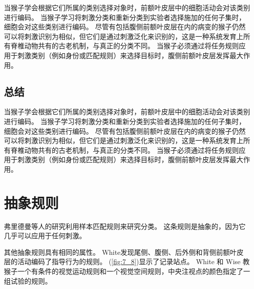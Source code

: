 当猴子学会根据它们所属的类别选择对象时，前额叶皮层中的细胞活动会对该类别进行编码。
当猴子学习将刺激分类和重新分类到实验者选择施加的任何子集时，细胞会对这些类别进行编码。
尽管有包括腹侧前额叶皮层在内的病变的猴子仍然可以将刺激识别为相似，但它们是通过刺激泛化来识别的，这是一种系统发育上所有脊椎动物共有的古老机制，与真正的分类不同。
当猴子必须通过将任务规则应用于刺激类别（例如身份或匹配规则）来选择目标时，腹侧前额叶皮层发挥最大作用。



\subsection{总结}
\par
当猴子学会根据它们所属的类别选择对象时，前额叶皮层中的细胞活动会对该类别进行编码。
当猴子学习将刺激分类和重新分类到实验者选择施加的任何子集时，细胞会对这些类别进行编码。
尽管有包括腹侧前额叶皮层在内的病变的猴子仍然可以将刺激识别为相似，但它们是通过刺激泛化来识别的，这是一种系统发育上所有脊椎动物共有的古老机制，与真正的分类不同。
当猴子必须通过将任务规则应用于刺激类别（例如身份或匹配规则）来选择目标时，腹侧前额叶皮层发挥最大作用。



\section{抽象规则}
\par
弗里德曼等人的研究\cite{freedman2002visual}利用样本匹配规则来研究分类。 
这条规则是抽象的，因为它几乎可以应用于任何刺激。
\par


其他抽象规则具有相同的属性。
White\cite{white1999rule}发现尾侧、腹侧、后外侧和背侧前额叶皮层的活动编码了指导行为的规则。 
(\ref{fig:7_8})显示了记录站点。 
White 和 Wise 教猴子一个有条件的视觉运动规则和一个视觉空间规则，中央注视点的颜色指定了一组试验的规则。


